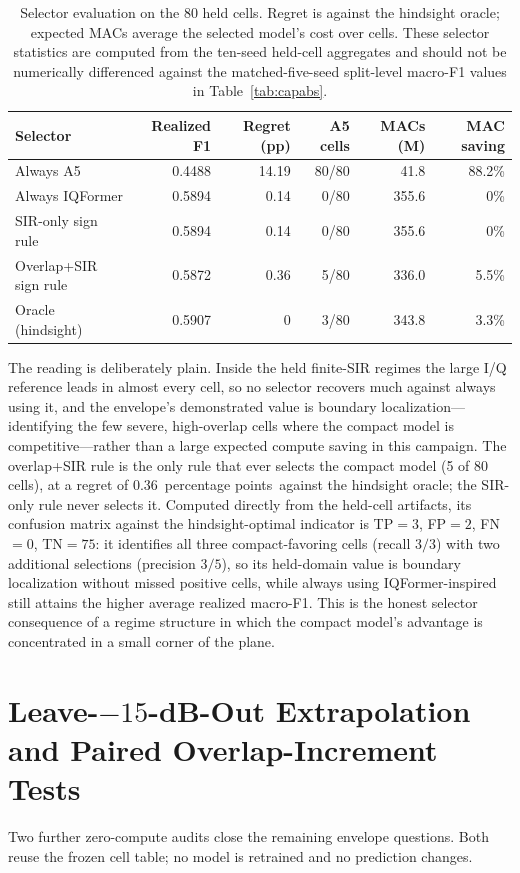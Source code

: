 \documentclass[letterpaper,onecolumn,11pt,journal]{IEEEtran}
\newcommand{\pp}{percentage points}
\begin{document}
\begin{table}[t]
\centering
\caption{Selector evaluation on the 80 held cells. Regret is against the
hindsight oracle; expected MACs average the selected model's cost over cells.
These selector statistics are computed from the ten-seed held-cell aggregates
and should not be numerically differenced against the matched-five-seed
split-level macro-F1 values in Table~\ref{tab:capabs}.}
\label{tab:selector}
\footnotesize
\setlength{\tabcolsep}{3pt}
\begin{tabular}{lrrrrr}
\toprule
Selector & Realized F1 & Regret (pp) & A5 cells & MACs (M) & MAC saving\\
\midrule
Always A5 & 0.4488 & 14.19 & 80/80 & 41.8 & 88.2\%\\
Always IQFormer & 0.5894 & 0.14 & 0/80 & 355.6 & 0\%\\
SIR-only sign rule & 0.5894 & 0.14 & 0/80 & 355.6 & 0\%\\
Overlap+SIR sign rule & 0.5872 & 0.36 & 5/80 & 336.0 & 5.5\%\\
Oracle (hindsight) & 0.5907 & 0 & 3/80 & 343.8 & 3.3\%\\
\bottomrule
\end{tabular}
\end{table}

The reading is deliberately plain. Inside the held finite-SIR regimes the
large I/Q reference leads in almost every cell, so no selector recovers much
against always using it, and the envelope's demonstrated value is boundary
localization---identifying the few severe, high-overlap cells where the
compact model is competitive---rather than a large expected compute saving in
this campaign. The overlap+SIR rule is the only rule that ever selects the
compact model (5 of 80 cells), at a regret of $0.36$~\pp\ against the
hindsight oracle; the SIR-only rule never selects it. Computed directly from
the held-cell artifacts, its confusion matrix against the hindsight-optimal
indicator is TP$=3$, FP$=2$, FN$=0$, TN$=75$: it identifies all three
compact-favoring cells (recall $3/3$) with two additional selections
(precision $3/5$), so its held-domain value is boundary localization without
missed positive cells, while always using IQFormer-inspired still attains the
higher average realized macro-F1. This is the honest
selector consequence of a regime structure in which the compact model's
advantage is concentrated in a small corner of the plane.

\section{Leave-$-15$-dB-Out Extrapolation and Paired Overlap-Increment Tests}
\label{sec:s4tests}
Two further zero-compute audits close the remaining envelope questions. Both
reuse the frozen cell table; no model is retrained and no prediction changes.
\end{document}
